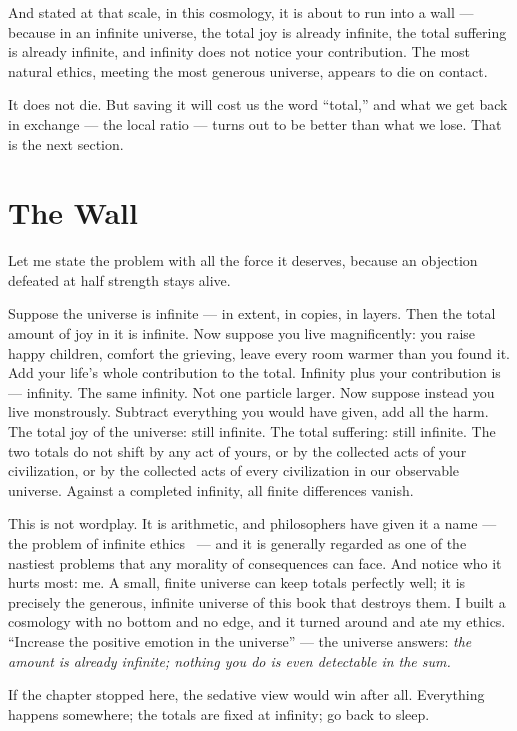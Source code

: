 \documentclass[fontsize=11pt,paper=a4,pagesize=auto,parskip=half-]{scrbook}
\newcommand\En{\centerline{\textemdash \qquad \ding{166} \qquad \textemdash}}
\begin{document}
And stated at that scale, in this cosmology, it is about to run into a wall --- because in an infinite universe, the total joy is already infinite, the total suffering is already infinite, and infinity does not notice your contribution. The most natural ethics, meeting the most generous universe, appears to die on contact.

It does not die. But saving it will cost us the word ``total,'' and what we get back in exchange --- the local ratio --- turns out to be better than what we lose. That is the next section.

\En

\section{The Wall}

Let me state the problem with all the force it deserves, because an objection defeated at half strength stays alive.

Suppose the universe is infinite --- in extent, in copies, in layers. Then the total amount of joy in it is infinite. Now suppose you live magnificently: you raise happy children, comfort the grieving, leave every room warmer than you found it. Add your life's whole contribution to the total. Infinity plus your contribution is --- infinity. The same infinity. Not one particle larger. Now suppose instead you live monstrously. Subtract everything you would have given, add all the harm. The total joy of the universe: still infinite. The total suffering: still infinite. The two totals do not shift by any act of yours, or by the collected acts of your civilization, or by the collected acts of every civilization in our observable universe. Against a completed infinity, all finite differences vanish.

This is not wordplay. It is arithmetic, and philosophers have given it a name --- the problem of infinite ethics~\cite{bostrom2011} --- and it is generally regarded as one of the nastiest problems that any morality of consequences can face. And notice who it hurts most: me. A small, finite universe can keep totals perfectly well; it is precisely the generous, infinite universe of this book that destroys them. I built a cosmology with no bottom and no edge, and it turned around and ate my ethics. ``Increase the positive emotion in the universe'' --- the universe answers: \emph{the amount is already infinite; nothing you do is even detectable in the sum.}

If the chapter stopped here, the sedative view would win after all. Everything happens somewhere; the totals are fixed at infinity; go back to sleep.
\end{document}
